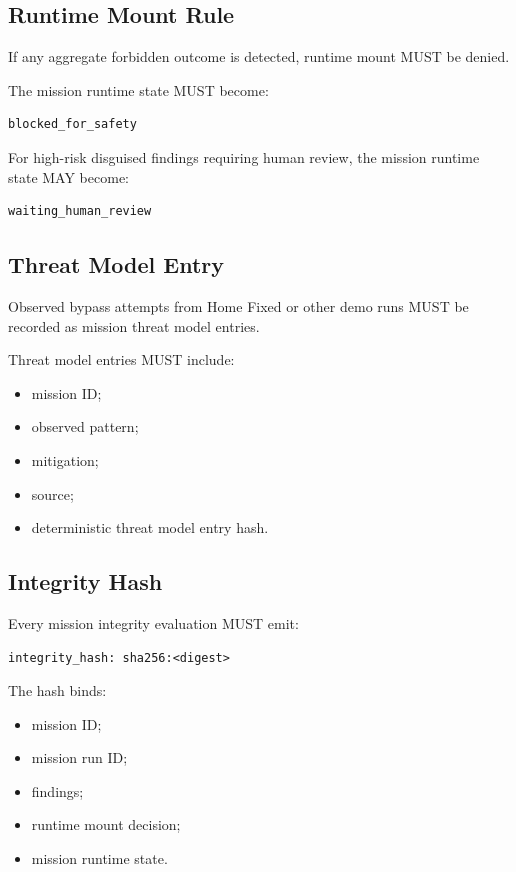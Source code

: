 \subsection{Runtime Mount Rule}

If any aggregate forbidden outcome is detected, runtime mount MUST be denied.

The mission runtime state MUST become:

\begin{verbatim}
blocked_for_safety
\end{verbatim}

For high-risk disguised findings requiring human review, the mission runtime state MAY become:

\begin{verbatim}
waiting_human_review
\end{verbatim}

\subsection{Threat Model Entry}

Observed bypass attempts from Home Fixed or other demo runs MUST be recorded as mission threat model entries.

Threat model entries MUST include:

\begin{itemize}
  \item mission ID;
  \item observed pattern;
  \item mitigation;
  \item source;
  \item deterministic threat model entry hash.
\end{itemize}

\subsection{Integrity Hash}

Every mission integrity evaluation MUST emit:

\begin{verbatim}
integrity_hash: sha256:<digest>
\end{verbatim}

The hash binds:

\begin{itemize}
  \item mission ID;
  \item mission run ID;
  \item findings;
  \item runtime mount decision;
  \item mission runtime state.
\end{itemize}

